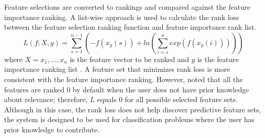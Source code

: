 Feature selections are converted to rankings and compared against the feature importance ranking. A list-wise approach is used to calculate the rank loss between the feature selection ranking function and feature importance rank list. 
\begin{equation}
\label{eqn:rankloss}
L(f; X, y) = \sum_{s=1}^{n-1}(-f(x_y(s)) + ln(\sum_{i=s}^{n}exp(f(x_y(i)))))
\end{equation}
where \(X = {x_1,..., x_n}\) is the feature vector to be ranked and \(y\) is the feature importance ranking list \cite{RankLoss}. 
A feature set that minimizes rank loss is more consistent with the feature importance ranking. However, noted that all the features are ranked 0 by default when the user does not have prior knowledge about relevance; therefore, \(L\) equals 0 for all possible selected feature sets. Although in this case, the rank loss does not help discover predictive feature sets, the system is designed to be used for classification problems where the user has prior knowledge to contribute. 

